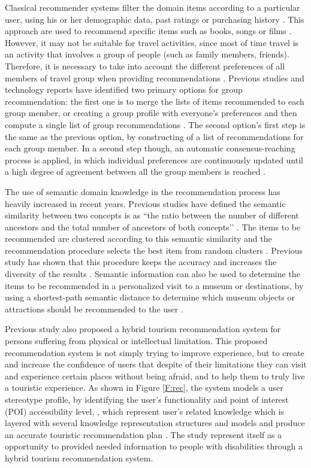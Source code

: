 Classical recommender systems filter the domain items according to a particular user, 
using his or her demographic data, past ratings or purchasing history \cite{LU201512}. 
This approach are used to recommend specific items such as books, songs or films 
\cite{LU201512}. However, it may not be suitable for travel activities, since most 
of time travel is an activity that involves a group of people (such as family members, 
friends). Therefore, it is necessary to take into account the different preferences of 
all members of travel group when providing recommendations \cite{morenorecommender}. 
Previous studies and technology reports have identified two primary options for group 
recommendation: the first one is to merge the lists of items recommended to each group 
member, or creating a group profile with everyone’s preferences and then compute a 
single list of group recommendations \cite{Garcia2009}. The second option’s first 
step is the same as the previous option, by constructing of a list of recommendations 
for each group member. In a second step though, an automatic consensus-reaching 
process is applied, in which individual preferences are continuously updated until 
a high degree of agreement between all the group members is reached \cite{Garcia2009}.

The use of semantic domain knowledge in the recommendation process has heavily 
increased in recent years. Previous studies have defined the semantic similarity 
between two concepts is as ``the ratio between the number of different ancestors 
and the total number of ancestors of both concepts’’ \cite{morenorecommender}. 
The items to be recommended are clustered according to this semantic similarity 
and the recommendation procedure selects the best item from random clusters \cite{Santos2018}. 
Previous study has shown that this procedure keeps the accuracy and increases 
the diversity of the results \cite{morenorecommender}. Semantic information can 
also be used to determine the items to be recommended in a personalized visit to 
a museum or destinations, by using a shortest-path semantic distance to determine
which museum objects or attractions should be recommended to the user \cite{morenorecommender}. 

Previous study also proposed a hybrid tourism recommendation system for persons 
suffering from physical or intellectual limitation. This proposed recommendation 
system is not simply trying to improve experience, but to create and increase the 
confidence of users that despite of their limitations they can visit and experience certain
places without being afraid, and to help them to truly live a touristic experience. 
As shown in Figure \ref{F:rec}, the system models a user stereotype profile, by
identifying the user’s functionality and point of interest (POI) accessibility level, 
, which represent user’s related knowledge which is layered with several knowledge 
representation structures and models and produce an accurate touristic recommendation plan \cite{Santos2018}. 
The study represent itself as a opportunity to provided needed information to 
people with disabilities through a hybrid tourism recommendation system. 

